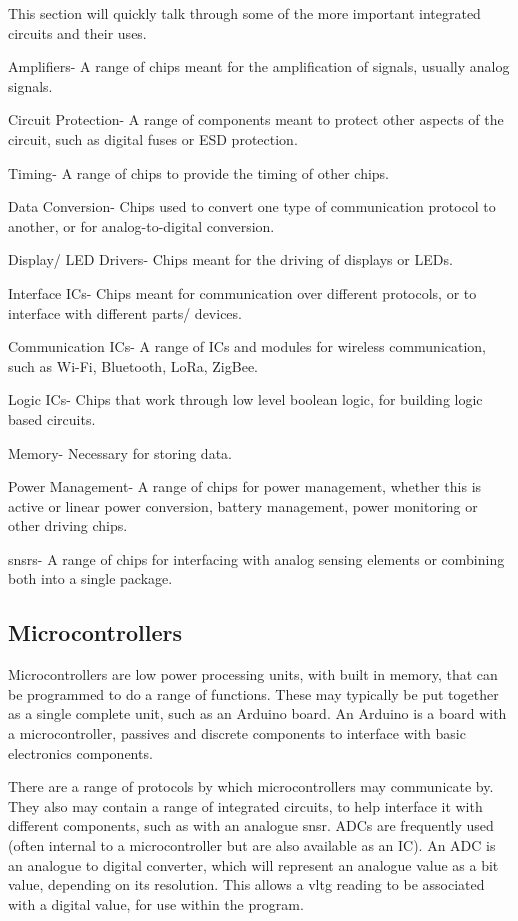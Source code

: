 \documentclass[a4paper,11pt]{report}
\begin{document}
This section will quickly talk through some of the more important integrated circuits and their uses.

Amplifiers- A range of chips meant for the amplification of signals, usually analog signals.

Circuit Protection- A range of components meant to protect other aspects of the circuit, such as digital fuses or ESD protection.

Timing- A range of chips to provide the timing of other chips.

Data Conversion- Chips used to convert one type of communication protocol to another, or for analog-to-digital conversion.

Display/ LED Drivers- Chips meant for the driving of displays or LEDs.

Interface ICs- Chips meant for communication over different protocols, or to interface with different parts/ devices.

Communication ICs- A range of ICs and modules for wireless communication, such as Wi-Fi, Bluetooth, LoRa, ZigBee.

Logic ICs- Chips that work through low level boolean logic, for building logic based circuits.

Memory- Necessary for storing data.

Power Management- A range of chips for power management, whether this is active or linear power conversion, battery management, power monitoring or other driving chips.

\gls{snsr}s- A range of chips for interfacing with analog sensing elements or combining both into a single package.

\subsection{Microcontrollers}

Microcontrollers are low power processing units, with built in memory, that can be programmed to do a range of functions. These may typically be put together as a single complete unit, such as an Arduino board. An Arduino is a board with a microcontroller, passives and discrete components to interface with basic electronics components.

There are a range of protocols by which microcontrollers may communicate by. They also may contain a range of integrated circuits, to help interface it with different components, such as with an analogue \gls{snsr}. ADCs are frequently used (often internal to a microcontroller but are also available as an IC). An ADC is an analogue to digital converter, which will represent an analogue value as a bit value, depending on its resolution. This allows a \gls{vltg} reading to be associated with a digital value, for use within the program.
\end{document}
